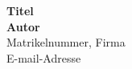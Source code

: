 \documentclass[a4paper, german, 10pt]{extarticle}
\begin{document}
\let\stdsection\section
\renewcommand{\section}[1]{\begin{center}\stdsection*{#1}\end{center}}

\let\stdsubsection\subsection
\renewcommand\subsection{\stdsubsection*}

\begin{center}
	\textbf{\Large{Titel}}\\
	\vspace{0.5cm}
	\textbf{\large{Autor}}\\
	\vspace{0.2cm}
	\large{Matrikelnummer, Firma}\\
	\vspace{0.2cm}
	\large{E-mail-Adresse}\\
	\vspace{0.8cm}
\end{center}

\begin{multicols}{2}

\small

\normalsize



\end{multicols}


%
%
\end{document}
